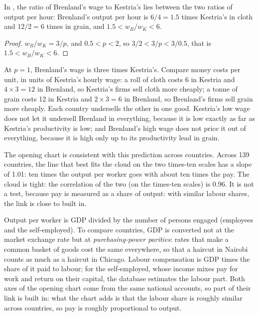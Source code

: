 \begin{proposition}\label{prop:g10:ricardo-model:wage}
In , the ratio of Brenland's wage to Kestria's lies between the two ratios of output
per hour: Brenland's output per hour is $6/4 = 1.5$ times Kestria's in cloth and $12/2 = 6$ times in grain,
and $1.5 < w_B/w_K < 6$.
\end{proposition}
\begin{proof}
$w_B/w_K = 3/p$, and $0.5 < p < 2$, so $3/2 < 3/p < 3/0.5$, that is $1.5 < w_B/w_K < 6$.
\end{proof}

At $p = 1$, Brenland's wage is three times Kestria's. Compare money costs per unit, in units of Kestria's
hourly wage: a roll of cloth costs 6 in Kestria and $4 \times 3 = 12$ in Brenland, so Kestria's firms sell
cloth more cheaply; a tonne of grain costs 12 in Kestria and $2 \times 3 = 6$ in Brenland, so Brenland's firms
sell grain more cheaply. Each country undersells the other in one good. Kestria's low wage does not let it
undersell Brenland in everything, because it is low exactly as far as Kestria's productivity is low; and
Brenland's high wage does not price it out of everything, because it is high only up to its productivity
lead in grain.

The opening chart is consistent with this prediction across countries. Across 139 countries, the line that
best fits the cloud on the two times-ten scales has a slope of 1.01: ten times the output per worker goes
with about ten times the pay. The cloud is tight: the correlation of the two (on the times-ten scales) is
0.96. It is not a test, because pay is measured as a share of output: with similar labour shares, the link
is close to built in.

\begin{measure}
Output per worker is GDP divided by the number of persons engaged (employees and the self-employed). To
compare countries, GDP is converted not at the market exchange rate but at \emph{purchasing-power
parities}: rates that make a common basket of goods cost the same everywhere, so that a haircut in Nairobi
counts as much as a haircut in Chicago. Labour compensation is GDP times the share of it paid to labour; for
the self-employed, whose income mixes pay for work and return on their capital, the database estimates the
labour part. Both axes of the opening chart come from the same national accounts, so part of their link is
built in: what the chart adds is that the labour share is roughly similar across countries, so pay is
roughly proportional to output.
\end{measure}

